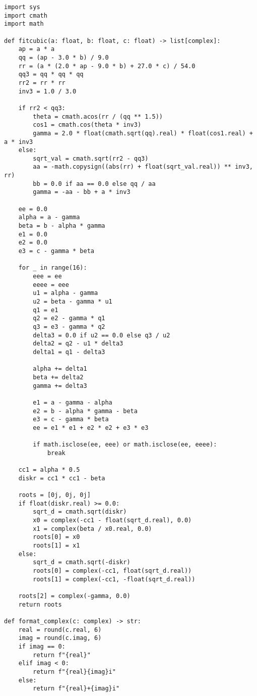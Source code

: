 \documentclass[11pt]{amsart}
\begin{document}
\begin{lstlisting}
import sys
import cmath
import math

def fitcubic(a: float, b: float, c: float) -> list[complex]:
    ap = a * a
    qq = (ap - 3.0 * b) / 9.0
    rr = (a * (2.0 * ap - 9.0 * b) + 27.0 * c) / 54.0
    qq3 = qq * qq * qq
    rr2 = rr * rr
    inv3 = 1.0 / 3.0

    if rr2 < qq3:
        theta = cmath.acos(rr / (qq ** 1.5))
        cos1 = cmath.cos(theta * inv3)
        gamma = 2.0 * float(cmath.sqrt(qq).real) * float(cos1.real) + a * inv3
    else:
        sqrt_val = cmath.sqrt(rr2 - qq3)
        aa = -math.copysign((abs(rr) + float(sqrt_val.real)) ** inv3, rr)
        bb = 0.0 if aa == 0.0 else qq / aa
        gamma = -aa - bb + a * inv3

    ee = 0.0
    alpha = a - gamma
    beta = b - alpha * gamma
    e1 = 0.0
    e2 = 0.0
    e3 = c - gamma * beta

    for _ in range(16):
        eee = ee
        eeee = eee
        u1 = alpha - gamma
        u2 = beta - gamma * u1
        q1 = e1
        q2 = e2 - gamma * q1
        q3 = e3 - gamma * q2
        delta3 = 0.0 if u2 == 0.0 else q3 / u2
        delta2 = q2 - u1 * delta3
        delta1 = q1 - delta3

        alpha += delta1
        beta += delta2
        gamma += delta3

        e1 = a - gamma - alpha
        e2 = b - alpha * gamma - beta
        e3 = c - gamma * beta
        ee = e1 * e1 + e2 * e2 + e3 * e3

        if math.isclose(ee, eee) or math.isclose(ee, eeee):
            break

    cc1 = alpha * 0.5
    diskr = cc1 * cc1 - beta

    roots = [0j, 0j, 0j]
    if float(diskr.real) >= 0.0:
        sqrt_d = cmath.sqrt(diskr)
        x0 = complex(-cc1 - float(sqrt_d.real), 0.0)
        x1 = complex(beta / x0.real, 0.0)
        roots[0] = x0
        roots[1] = x1
    else:
        sqrt_d = cmath.sqrt(-diskr)
        roots[0] = complex(-cc1, float(sqrt_d.real))
        roots[1] = complex(-cc1, -float(sqrt_d.real))

    roots[2] = complex(-gamma, 0.0)
    return roots

def format_complex(c: complex) -> str:
    real = round(c.real, 6)
    imag = round(c.imag, 6)
    if imag == 0:
        return f"{real}"
    elif imag < 0:
        return f"{real}{imag}i"
    else:
        return f"{real}+{imag}i"


\end{lstlisting}
\end{document}
